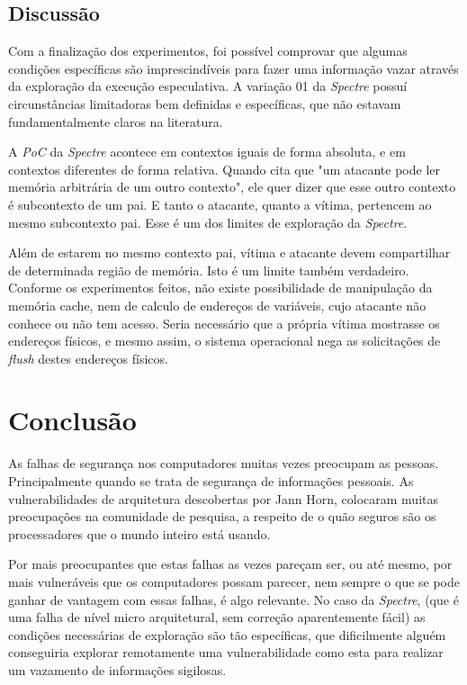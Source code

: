 \documentclass[
	article,			    %
	12pt,				    %
	oneside,			    %
	a4paper,			    %
	chapter=TITLE,		    %
	section=TITLE,		    %
	subsection=TITLE,	    %
	english,			    %
	brazil,				    %
	sumario=tradicional
]{abntex2}
\begin{document}
\subsection{Discussão}
Com a finalização dos experimentos, foi possível comprovar que algumas condições específicas são imprescindíveis para fazer uma informação vazar através da exploração da execução especulativa. A variação 01 da \emph{Spectre} possuí circunstâncias limitadoras bem definidas e específicas, que não estavam fundamentalmente claros na literatura.

A \emph{PoC} da \emph{Spectre} acontece em contextos iguais de forma absoluta, e em contextos diferentes de forma relativa. Quando  cita que "um atacante pode ler memória arbitrária de um outro contexto", ele quer dizer que esse outro contexto é subcontexto de um pai. E tanto o atacante, quanto a vítima, pertencem ao mesmo subcontexto pai. Esse é um dos limites de exploração da \emph{Spectre}.

Além de estarem no mesmo contexto pai, vítima e atacante devem compartilhar de determinada região de memória. Isto é um limite também verdadeiro. Conforme os experimentos feitos, não existe possibilidade de manipulação da memória cache, nem de calculo de endereços de variáveis, cujo atacante não conhece ou não tem acesso. Seria necessário que a própria vítima mostrasse os endereços físicos, e mesmo assim, o sistema operacional nega as solicitações de \emph{flush} destes endereços físicos.

\section{Conclusão}
As falhas de segurança nos computadores muitas vezes preocupam as pessoas. Principalmente quando se trata de segurança de informações pessoais. As vulnerabilidades de arquitetura descobertas por Jann Horn, colocaram muitas preocupações na comunidade de pesquisa, a respeito de o quão seguros são os processadores que o mundo inteiro está usando.

Por mais preocupantes que estas falhas as vezes pareçam ser, ou até mesmo, por mais vulneráveis que os computadores possam parecer, nem sempre o que se pode ganhar de vantagem com essas falhas, é algo relevante. No caso da \emph{Spectre}, (que é uma falha de nível micro arquitetural, sem correção aparentemente fácil) as condições necessárias de exploração são tão específicas, que dificilmente alguém conseguiria explorar remotamente uma vulnerabilidade como esta para realizar um vazamento de informações sigilosas.
\end{document}
